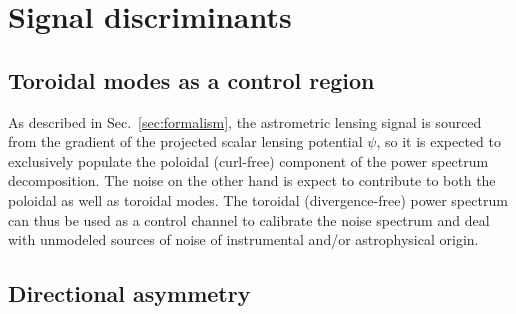 \documentclass[prd,aps,twocolumn,nofootinbib,superscriptaddress,preprintnumbers,balancelastpage,longbibliography,floatfix]{revtex4-1}
\begin{document}
\section{Signal discriminants}
\label{sec:handles}

\subsection{Toroidal modes as a control region}

As described in Sec.~\ref{sec:formalism}, the astrometric lensing signal is sourced from the gradient of the projected scalar lensing potential $\psi$, so it is expected to exclusively populate the poloidal (curl-free) component of the power spectrum decomposition. The noise on the other hand is expect to contribute to both the poloidal as well as toroidal modes. The toroidal (divergence-free) power spectrum can thus be used as a control channel to calibrate the noise spectrum and deal with unmodeled sources of noise of instrumental and/or astrophysical origin.

\subsection{Directional asymmetry}\label{sec:directionalasymm}
\end{document}
